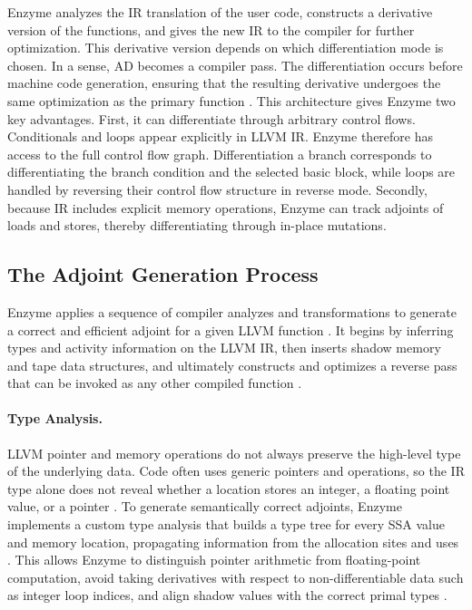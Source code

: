 Enzyme analyzes the IR translation of the user code, constructs a derivative version of the functions, and gives the new IR to the compiler for further optimization. This derivative version depends on which differentiation mode is chosen. In a sense, AD becomes a compiler pass. The differentiation occurs before machine code generation, ensuring that the resulting derivative undergoes the same optimization as the primary function \parencite{moses_instead_2020}. This architecture gives Enzyme two key advantages. First, it can differentiate through arbitrary control flows. Conditionals and loops appear explicitly in LLVM IR. Enzyme therefore has access to the full control flow graph. Differentiation a branch corresponds to differentiating the branch condition and the selected basic block, while loops are handled by reversing their control flow structure in reverse mode. Secondly, because IR includes explicit memory operations, Enzyme can track adjoints of loads and stores, thereby differentiating through in-place mutations.

\subsection{The Adjoint Generation Process}

Enzyme applies a sequence of compiler analyzes and transformations to generate a correct and efficient adjoint for a given LLVM function \parencite{moses_instead_2020}. It begins by inferring types and activity information on the LLVM IR, then inserts shadow memory and tape data structures, and ultimately constructs and optimizes a reverse pass that can be invoked as any other compiled function \parencite{moses_instead_2020}.

\paragraph{Type Analysis.}
LLVM pointer and memory operations do not always preserve the high-level type of the underlying data. Code often uses generic pointers and operations, so the IR type alone does not reveal whether a location stores an integer, a floating point value, or a pointer \parencite{moses_instead_2020}. To generate semantically correct adjoints, Enzyme implements a custom type analysis that builds a type tree for every SSA value and memory location, propagating information from the allocation sites and uses \parencite{moses_instead_2020}. This allows Enzyme to distinguish pointer arithmetic from floating-point computation, avoid taking derivatives with respect to non-differentiable data such as integer loop indices, and align shadow values with the correct primal types \parencite{moses_instead_2020,noauthor_llvm_nodate}.

